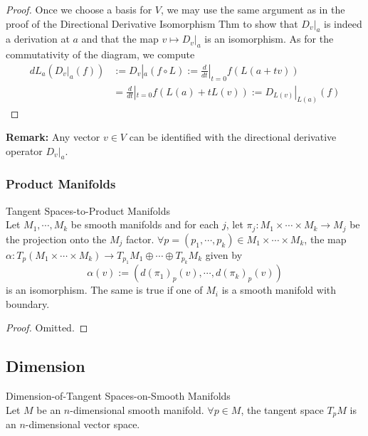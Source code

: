 \begin{proof}
    Once we choose a basis for $V$, we may use the same argument as in the proof of the Directional Derivative Isomorphism Thm to show that $D_v|_a$ is indeed a derivation at $a$ and that the map $v \mapsto D_v|_a$ is an isomorphism. As for the commutativity of the diagram, we compute
    \begin{align*}
        dL_a(D_v|_a(f))&:= D_v|_a (f\circ L):= \frac{d}{dt}|_{t=0} f(L(a+tv))\\
        &= \frac{d}{dt}|_{t=0} f(L(a) +tL(v)):= D_{L(v)}|_{L(a)} (f)
    \end{align*}
\end{proof}

\noindent\textbf{Remark:} Any vector $v\in V$ can be identified with the directional derivative operator $D_v|_a$.

\subsubsection{Product Manifolds}

\begin{proposition}{Tangent Spaces-to-Product Manifolds}\\
Let $M_1 ,\cdots, M_k$ be smooth manifolds and for each $j$, let $\pi_j: M_1 \times \cdots \times M_k \to M_j$ be the projection onto the $M_j$ factor. $\forall p= (p_1 ,\cdots, p_k) \in M_1 \times \cdots \times M_k$, the map $\alpha: T_p(M_1 \times \cdots \times M_k) \to T_{p_1} M_1\oplus \cdots \oplus T_{p_k}M_k$ given by
\[
\alpha(v) := (d(\pi_1)_p (v) ,\cdots, d(\pi_k)_p(v))
\]
is an isomorphism. The same is true if one of $M_i$ is a smooth manifold with boundary.
\end{proposition}

\begin{proof}
    Omitted.
\end{proof}

\subsection{Dimension}


\begin{proposition}{Dimension-of-Tangent Spaces-on-Smooth Manifolds}\\
Let $M$ be an $n$-dimensional smooth manifold. $\forall p\in M$, the tangent space $T_pM$ is an $n$-dimensional vector space.
\end{proposition}

